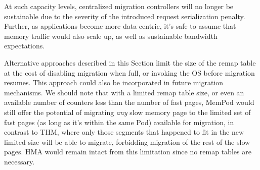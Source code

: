 At such capacity levels, centralized migration controllers will no longer be sustainable due to the severity of the introduced request serialization penalty. Further, as applications become more data-centric, it's safe to assume that memory traffic would also scale up, as well as sustainable bandwidth expectations. 

Alternative approaches described in this Section limit the size of the remap table at the cost of disabling migration when full, or invoking the OS before migration resumes. This approach could also be incorporated in future migration mechanisms. We should note that with a limited remap table size, or even an available number of counters less than the number of fast pages, MemPod would still offer the potential of migrating \textit{any} slow memory page to the limited set of fast pages (as long as it's within the same Pod) available for migration, in contrast to THM, where only those segments that happened to fit in the new limited size will be able to migrate, forbidding migration of the rest of the slow pages. HMA would remain intact from this limitation since no remap tables are necessary.



















































